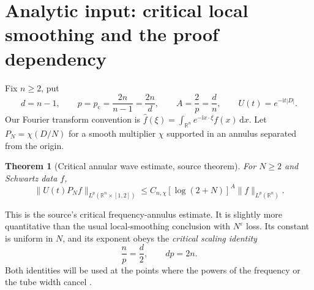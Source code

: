 \documentclass[11pt,a4paper]{article}
\numberwithin{equation}{section}
\newtheorem{theorem}{Theorem}[section]
\theoremstyle{definition}
\theoremstyle{remark}
\newcommand{\R}{\mathbb R}
\newcommand{\eps}{\varepsilon}
\newcommand{\dd}{\,\mathrm d}
\newcommand{\pc}{p_{\mathrm c}}
\begin{document}
\section{Analytic input: critical local smoothing and the proof dependency}
\label{sec:input}
Fix $n\ge2$, put
\[
 d=n-1,\qquad p=\pc=\frac{2n}{n-1}=\frac{2n}{d},
 \qquad A=\frac{2}{p}=\frac dn, \qquad U(t)=e^{-\mathrm it|D|}.
\]
Our Fourier transform convention is
$\widehat f(\xi)=\int_{\R^n}e^{-\mathrm ix\cdot\xi}f(x)\dd x$.
Let $P_N=\chi(D/N)$ for a smooth multiplier $\chi$ supported in an
annulus separated from the origin.

\begin{theorem}[Critical annular wave estimate, source theorem]
\label{thm:annular}
For $N\ge2$ and Schwartz data $f$,
\begin{equation}\label{eq:annular}
 \|U(t)P_N f\|_{L^p(\R^n\times[1,2])}
 \le C_{n,\chi}[\log(2+N)]^{A}\|f\|_{L^p(\R^n)}.
\end{equation}
\end{theorem}
This is the source's critical frequency-annulus estimate. It is
slightly more quantitative than the usual local-smoothing conclusion
with $N^\eps$ loss. Its constant is uniform in $N$, and its exponent
obeys the \emph{critical scaling identity}
\begin{equation}\label{eq:scaling}
 \frac np=\frac d2, \qquad dp=2n.
\end{equation}
Both identities will be used at the points where the powers of the
frequency or the tube width cancel \cite{introduction,transfer}.
\end{document}
